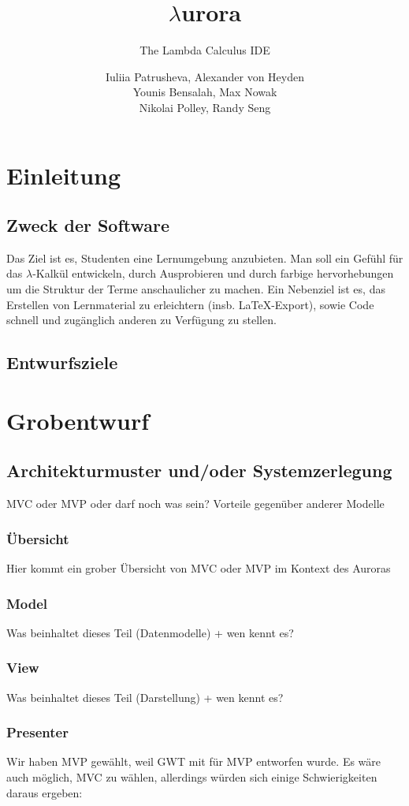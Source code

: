 \documentclass[parskip=full,11pt,twoside]{scrartcl}
\title{$\lambda$urora}
\subtitle{The Lambda Calculus IDE}
\author{Iuliia Patrusheva, Alexander von Heyden\\
Younis Bensalah, Max Nowak\\
Nikolai Polley, Randy Seng}
\begin{document}
\maketitle
\pagebreak
\tableofcontents
\pagebreak
\section{Einleitung}
\subsection{Zweck der Software}
Das Ziel ist es, Studenten eine Lernumgebung anzubieten. Man soll ein Gefühl für das $\lambda$-Kalkül entwickeln, durch Ausprobieren
und durch farbige hervorhebungen um die Struktur der Terme anschaulicher zu machen.
Ein Nebenziel ist es, das Erstellen von Lernmaterial zu erleichtern (insb. \LaTeX-Export), sowie Code schnell und zugänglich anderen zu Verfügung zu stellen.
\subsection{Entwurfsziele}
\pagebreak

\section{Grobentwurf}
\subsection{Architekturmuster und/oder Systemzerlegung}
MVC oder MVP oder darf noch was sein?
Vorteile gegenüber anderer Modelle
\subsubsection{Übersicht}
Hier kommt ein grober Übersicht von MVC oder MVP im Kontext des Auroras
\subsubsection{Model}
Was beinhaltet dieses Teil (Datenmodelle) + wen kennt es?
\subsubsection{View}
Was beinhaltet dieses Teil (Darstellung) + wen kennt es?
\subsubsection{Presenter}
Wir haben MVP gewählt, weil GWT mit für MVP entworfen wurde. Es wäre auch möglich, MVC zu wählen, allerdings würden sich
einige Schwierigkeiten daraus ergeben: %
\end{document}
